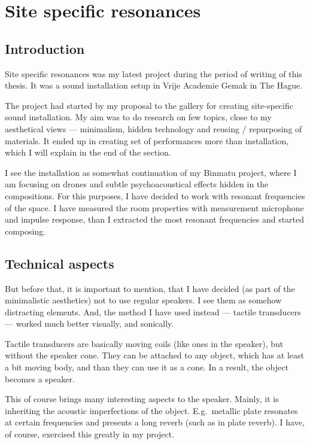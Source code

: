 \documentclass[12pt,a4paper,oneside]{report}
\begin{document}
\clearpage
\section{Site specific resonances}
\subsection{Introduction}
Site specific resonances was my latest project during the period of writing of this thesis. It was a sound installation setup in Vrije Academie Gemak in The Hague.

The project had started by my proposal to the gallery for creating site-specific sound installation. My aim was to do research on few topics, close to my aesthetical views --- minimalism, hidden technology and reusing / repurposing of materials. It ended up in creating set of performances more than installation, which I will explain in the end of the section.

I see the installation as somewhat continuation of my Binmatu project, where I am focusing on drones and subtle psychoacoustical effects hidden in the compositions. For this purposes, I have decided to work with resonant frequencies of the space. I have measured the room properties with measurement microphone and impulse response, than I extracted the most resonant frequencies and started composing.

\subsection{Technical aspects}

But before that, it is important to mention, that I have decided (as part of the minimalistic aesthetics) not to use regular speakers. I see them as somehow distracting elements. And, the method I have used instead --- tactile transducers --- worked much better visually, and sonically.

Tactile transducers are basically moving coils (like ones in the speaker), but without the speaker cone. They can be attached to any object, which has at least a bit moving body, and than they can use it as a cone. In a result, the object becomes a speaker. 

This of course brings many interesting aspects to the speaker. Mainly, it is inheriting the acoustic imperfections of the object. E.g.\ metallic plate resonates at certain frequencies and presents a long reverb (such as in plate reverb). I have, of course, exercised this greatly in my project.
\end{document}

